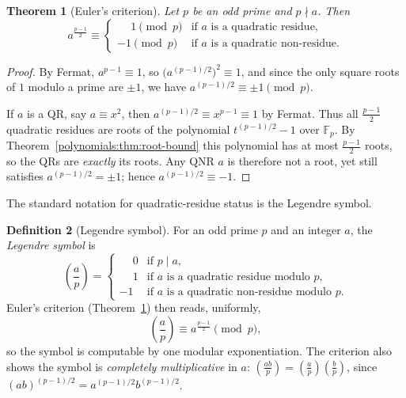 \documentclass[11pt,a4paper]{article}
\newtheorem{theorem}{Theorem}[section]
\theoremstyle{definition}
\newtheorem{definition}[theorem]{Definition}
\theoremstyle{remark}
\newcommand{\Fp}{\ensuremath{\mathbb{F}_{p}}}
\newcommand{\legendre}[2]{\left(\frac{#1}{#2}\right)}
\begin{document}
\begin{theorem}[Euler's criterion]\label{numbertheory:thm:euler-criterion}
Let \(p\) be an odd prime and \(p \nmid a\). Then
\[
a^{\frac{p-1}{2}} \equiv \begin{cases} \phantom{-}1 \pmod p & \text{if } a \text{ is a quadratic residue,}\\[2pt] -1 \pmod p & \text{if } a \text{ is a quadratic non-residue.}\end{cases}
\]
\end{theorem}

\begin{proof}
By Fermat, \(a^{p-1}\equiv 1\), so \(\bigl(a^{(p-1)/2}\bigr)^2 \equiv 1\), and since the only square roots of \(1\) modulo a prime are \(\pm 1\), we have \(a^{(p-1)/2}\equiv \pm 1 \pmod p\).

If \(a\) is a QR, say \(a \equiv x^2\), then \(a^{(p-1)/2}\equiv x^{p-1}\equiv 1\) by Fermat. Thus all \(\tfrac{p-1}{2}\) quadratic residues are roots of the polynomial \(t^{(p-1)/2}-1\) over \(\Fp\). By Theorem~\ref{polynomials:thm:root-bound} this polynomial has at most \(\tfrac{p-1}{2}\) roots, so the QRs are \emph{exactly} its roots. Any QNR \(a\) is therefore not a root, yet still satisfies \(a^{(p-1)/2}=\pm 1\); hence \(a^{(p-1)/2}\equiv -1\).
\end{proof}

The standard notation for quadratic-residue status is the Legendre symbol.

\begin{definition}[Legendre symbol]\label{numbertheory:def:legendre}
For an odd prime \(p\) and an integer \(a\), the \emph{Legendre symbol} is
\[
\legendre{a}{p} = \begin{cases} \phantom{-}0 & \text{if } p \mid a,\\ \phantom{-}1 & \text{if } a \text{ is a quadratic residue modulo } p,\\ -1 & \text{if } a \text{ is a quadratic non-residue modulo } p.\end{cases}
\]
Euler's criterion (Theorem~\ref{numbertheory:thm:euler-criterion}) then reads, uniformly,
\[
\legendre{a}{p} \equiv a^{\frac{p-1}{2}} \pmod p,
\]
so the symbol is computable by one modular exponentiation. The criterion also shows the symbol is \emph{completely multiplicative} in \(a\): \(\legendre{ab}{p} = \legendre{a}{p}\legendre{b}{p}\), since \((ab)^{(p-1)/2} = a^{(p-1)/2} b^{(p-1)/2}\).
\end{definition}
\end{document}
